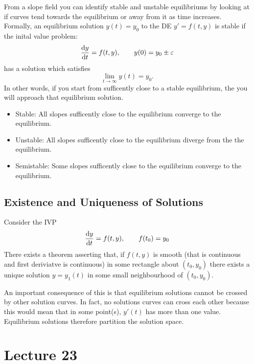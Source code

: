 \documentclass{report}
\begin{document}
From a slope field you can identify stable and unstable equilibriums by looking at if curves tend towards the equilibrium or away from it as time increases. \\

Formally, an equilibrium solution $y(t)=y_0$ to the DE $y' = f(t,y)$ is stable if the inital value problem:
$$
	\frac{\mathrm{d} y}{\mathrm{d} t} = f(t,y),\qquad y(0) = y_0 \pm\varepsilon
$$
has a solution which satisfies
$$
	\lim_{t\to\infty}y(t) = y_0.
$$
In other words, if you start from sufficently close to a stable equilibrium, the you will approach that equilibrium solution.
\begin{itemize}
	\item Stable: All slopes sufficently close to the equilibrium converge to the equilibrium.
	\item Unstable: All slopes sufficently close to the equilibrium diverge from the the equilibrium.
	\item Semistable: Some slopes sufficently close to the equilibrium converge to the equilibrium.
\end{itemize}


\subsection*{Existence and Uniqueness of Solutions}
Consider the IVP
$$
	\frac{\mathrm{d} y}{\mathrm{d} t} = f(t,y),\qquad f(t_0) = y_0
$$
There exists a theorem asserting that, if $f(t,y)$ is smooth (that is continuous and first deriviatve is continuous) in some rectangle about $(t_0, y_0)$ there exists a unique solution $y=y_1(t)$ in some small neighbourhood of $(t_0, y_0)$.


An important consequence of this is that equilibrium solutions cannot be crossed by other solution curves. In fact, no solutions curves can cross each other because this would mean that in some point(s), $y'(t)$ has more than one value. Equilibrium solutions therefore partition the solution space.

\section{Lecture 23}
\end{document}
